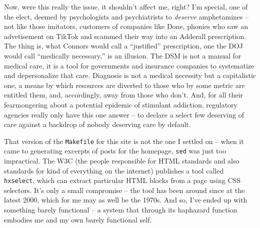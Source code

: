 \documentclass[11pt]{article}
\begin{document}
    Now, were this really the issue, it shouldn't affect me, right? I'm special, one of the elect, deemed by psychologists and psychiatrists to \textit{deserve} amphetamines -- not like those imitators, customers of companies like Done, phonies who saw an advetisement on TikTok and scammed their way into an Adderall prescription. The thing is, what Connors would call a ``justified'' prescription, one the DOJ would call ``medically necessary,'' is an illusion. The DSM is not a manual for medical care, it is a tool for governments and insurance companies to systematize and depersonalize that care. Diagnosis is not a medical necessity but a capitalistic one, a means by which resources are diverted to those who by some metric are entitled them, and, accordingly, away from those who don't. And, for all their fearmongering about a potential epidemic of stimulant addiction, regulatory agencies really only have this one answer -- to declare a select few deserving of care against a backdrop of nobody deserving care by default. 

    That version of the \texttt{Makefile} for this site is not the one I settled on -- when it came to generating excerpts of posts for the homepage, \texttt{sed} was just too impractical. The W3C (the people responsible for HTML standards and also standards for kind of everything on the internet) publishes a tool called \texttt{hxselect}, which can extract particular HTML blocks from a page using CSS selectors. It's only a small compromise -- the tool has been around since at the latest 2000, which for me may as well be the 1970s. And so, I've ended up with something barely functional -- a system that through its haphazard function embodies me and my own barely functional self. 
    \newpage
    \printbibliography[title={Bibliography}]
\end{document}

